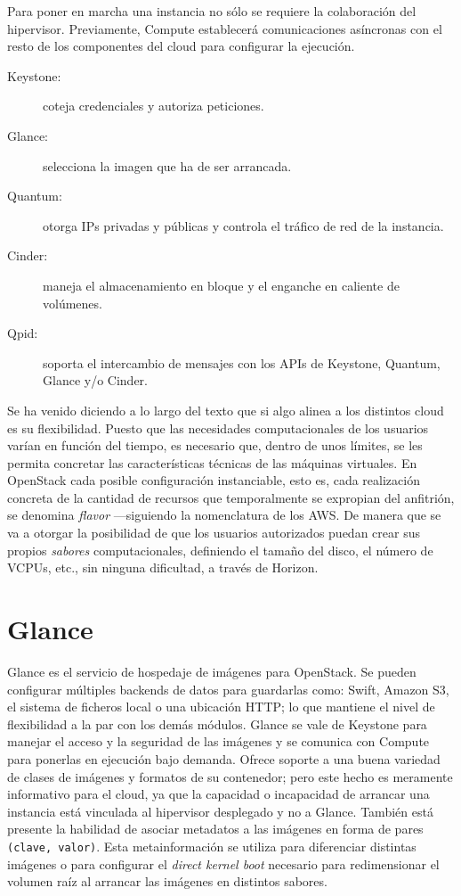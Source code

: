Para poner en marcha una instancia no s\'olo se requiere la colaboraci\'on del hipervisor. Previamente, Compute establecer\'a comunicaciones as\'incronas con el resto de los componentes del cloud para configurar la ejecuci\'on.

\begin{description}
 \item[Keystone:] coteja credenciales y autoriza peticiones.
 \item[Glance:] selecciona la imagen que ha de ser arrancada.
 \item[Quantum:] otorga IPs privadas y p\'ublicas y controla el tr\'afico de red de la instancia.
 \item[Cinder:] maneja el almacenamiento en bloque y el enganche en caliente de vol\'umenes.
 \item[Qpid:] soporta el intercambio de mensajes con los APIs de Keystone, Quantum, Glance y/o Cinder.
\end{description}

Se ha venido diciendo a lo largo del texto que si algo alinea a los distintos cloud es su flexibilidad. Puesto que las necesidades computacionales de los usuarios var\'ian en funci\'on del tiempo, es necesario que, dentro de unos l\'imites, se les permita concretar las caracter\'isticas t\'ecnicas de las m\'aquinas virtuales. En OpenStack cada posible configuraci\'on instanciable, esto es, cada realizaci\'on concreta de la cantidad de recursos que temporalmente se expropian del anfitri\'on, se denomina \emph{flavor} ---siguiendo la nomenclatura de los AWS. De manera que se va a otorgar la posibilidad de que los usuarios autorizados puedan crear sus propios \emph{sabores} computacionales, definiendo el tama\~no del disco, el n\'umero de VCPUs, etc., sin ninguna dificultad, a trav\'es de Horizon.


\section{Glance}\label{sec:glance}
\noindent Glance es el servicio de hospedaje de im\'agenes para OpenStack. Se pueden configurar m\'ultiples backends de datos para guardarlas como: Swift, Amazon S3, el sistema de ficheros local o una ubicaci\'on HTTP; lo que mantiene el nivel de flexibilidad a la par con los dem\'as m\'odulos. Glance se vale de Keystone para manejar el acceso y la seguridad de las im\'agenes y se comunica con Compute para ponerlas en ejecuci\'on bajo demanda.
Ofrece soporte a una buena variedad de clases de im\'agenes y formatos de su contenedor; pero este hecho es meramente informativo para el cloud, ya que la capacidad o incapacidad de arrancar una instancia est\'a vinculada al hipervisor desplegado y no a Glance. Tambi\'en est\'a presente la habilidad de asociar metadatos a las im\'agenes en forma de pares \texttt{(clave, valor)}. Esta metainformaci\'on se utiliza para diferenciar distintas im\'agenes o para configurar el \emph{direct kernel boot} necesario para redimensionar el volumen ra\'iz al arrancar las im\'agenes en distintos sabores.


